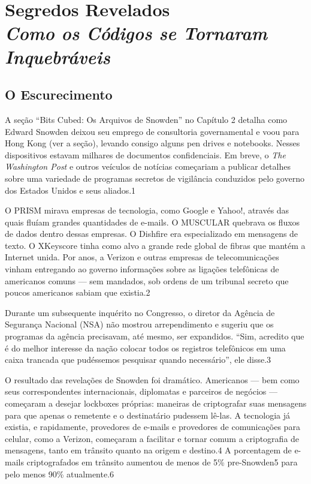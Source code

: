 \documentclass{book}
\newcommand{\ingles}[1]{\textit{#1}}
\begin{document}

\chapter[Segredos Revelados]{Segredos Revelados\\\large\textit{Como os Códigos se Tornaram Inquebráveis}}
\label{segredos}


\section{O Escurecimento} %
\label{segredos:desaparecendo}

A seção ``Bits Cubed: Os Arquivos de Snowden'' no Capítulo 2 detalha como Edward Snowden deixou seu emprego de consultoria governamental e voou para Hong Kong (ver a seção), levando consigo alguns pen drives e notebooks. Nesses dispositivos estavam milhares de documentos confidenciais. Em breve, o \ingles{The Washington Post} e outros veículos de notícias começariam a publicar detalhes sobre uma variedade de programas secretos de vigilância conduzidos pelo governo dos Estados Unidos e seus aliados.1

O PRISM mirava empresas de tecnologia, como Google e Yahoo!, através das quais fluíam grandes quantidades de e-mails. O MUSCULAR quebrava os fluxos de dados dentro dessas empresas. O Dishfire era especializado em mensagens de texto. O XKeyscore tinha como alvo a grande rede global de fibras que mantém a Internet unida. Por anos, a Verizon e outras empresas de telecomunicações vinham entregando ao governo informações sobre as ligações telefônicas de americanos comuns --- sem mandados, sob ordens de um tribunal secreto que poucos americanos sabiam que existia.2

Durante um subsequente inquérito no Congresso, o diretor da Agência de Segurança Nacional (NSA) não mostrou arrependimento e sugeriu que os programas da agência precisavam, até mesmo, ser expandidos. ``Sim, acredito que é do melhor interesse da nação colocar todos os registros telefônicos em uma caixa trancada que pudéssemos pesquisar quando necessário'', ele disse.3

O resultado das revelações de Snowden foi dramático. Americanos --- bem como seus correspondentes internacionais, diplomatas e parceiros de negócios --- começaram a desejar lockboxes próprias: maneiras de criptografar suas mensagens para que apenas o remetente e o destinatário pudessem lê-las. A tecnologia já existia, e rapidamente, provedores de e-mails e provedores de comunicações para celular, como a Verizon, começaram a facilitar e tornar comum a criptografia de mensagens, tanto em trânsito quanto na origem e destino.4 A porcentagem de e-mails criptografados em trânsito aumentou de menos de 5\% pre-Snowden5 para pelo menos 90\% atualmente.6
\end{document}
